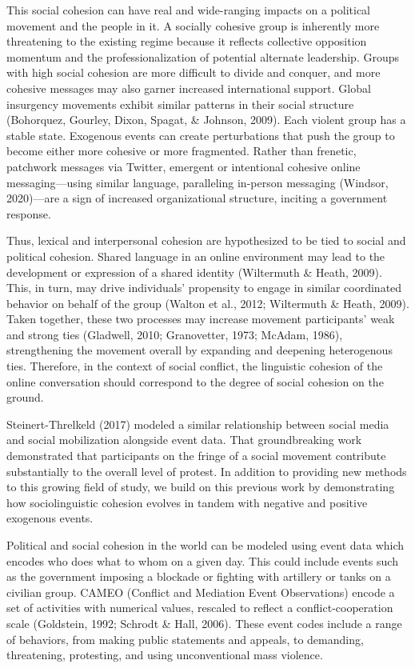\documentclass[english,man]{apa6}
\begin{document}
This social cohesion can have real and wide-ranging impacts on a political
movement and the people in it. A socially cohesive group is inherently more
threatening to the existing regime because it reflects collective opposition
momentum and the professionalization of potential alternate leadership. Groups
with high social cohesion are more difficult to divide and conquer, and more
cohesive messages may also garner increased international support. Global
insurgency movements exhibit similar patterns in their social structure
(Bohorquez, Gourley, Dixon, Spagat, \& Johnson, 2009). Each violent group has a stable state. Exogenous events
can create perturbations that push the group to become either more cohesive or
more fragmented. Rather than frenetic, patchwork messages via Twitter, emergent
or intentional cohesive online messaging---using similar language, paralleling
in-person messaging (Windsor, 2020)---are a sign of increased organizational
structure, inciting a government response.

Thus, lexical and interpersonal cohesion are hypothesized to be tied to social
and political cohesion. Shared language in an online environment may lead to the
development or expression of a shared identity (Wiltermuth \& Heath, 2009). This,
in turn, may drive individuals' propensity to engage in similar coordinated
behavior on behalf of the group (Walton et al., 2012; Wiltermuth \& Heath, 2009).
Taken together, these two processes may increase movement participants' weak and
strong ties (Gladwell, 2010; Granovetter, 1973; McAdam, 1986), strengthening the movement overall by expanding and
deepening heterogenous ties. Therefore, in the context of social conflict, the
linguistic cohesion of the online conversation should correspond to the degree
of social cohesion on the ground.

Steinert-Threlkeld (2017) modeled a similar relationship
between social media and social mobilization alongside event data. That
groundbreaking work demonstrated that participants on the fringe of a social
movement contribute substantially to the overall level of protest. In addition
to providing new methods to this growing field of study, we build on this
previous work by demonstrating how sociolinguistic cohesion evolves in
tandem with negative and positive exogenous events.

Political and social cohesion in the world can be modeled using event data which
encodes who does what to whom on a given day. This could include events such as
the government imposing a blockade or fighting with artillery or tanks on
a civilian group. CAMEO (Conflict and Mediation Event Observations) encode
a set of activities with numerical values, rescaled to reflect a
conflict-cooperation scale (Goldstein, 1992; Schrodt \& Hall, 2006). These event
codes include a range of behaviors, from making public statements and appeals,
to demanding, threatening, protesting, and using unconventional mass violence.
\end{document}
